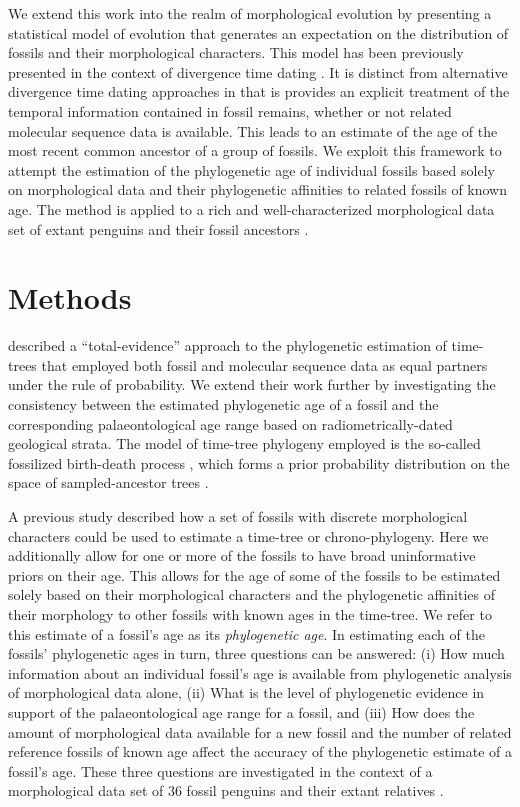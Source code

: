 \documentclass[11pt]{article}
\begin{document}
We extend this work into the realm of morphological evolution by presenting a statistical model of evolution that generates an expectation on the distribution of fossils and their morphological characters. This model has been previously presented in the context of divergence time dating \autocite{gavr2014,gavryushkina2015bayesian}. It is distinct from alternative divergence time dating approaches in that is provides an explicit treatment of the temporal information contained in fossil remains, whether or not related molecular sequence data is available. This leads to an estimate of the age of the most recent common ancestor of a group of fossils. We exploit this framework to attempt the estimation of the phylogenetic age of individual fossils based solely on morphological data and their phylogenetic affinities to related fossils of known age. The method is applied to a rich and well-characterized morphological data set of extant penguins and their fossil ancestors \autocite{ksepka2010,ksepka2012}.

\section*{Methods}

\textcite{gavryushkina2015bayesian} described a ``total-evidence'' approach to the phylogenetic estimation of time-trees that employed both fossil and molecular sequence data as equal partners under the rule of probability. We extend their work further by investigating the consistency between the estimated phylogenetic age of a fossil and the corresponding palaeontological age range based on radiometrically-dated geological strata. The model of time-tree phylogeny employed is the so-called fossilized birth-death process \autocite{Heath2014}, which forms a prior probability distribution on the space of sampled-ancestor trees \autocite{Gavr2013}.

A previous study described how a set of fossils with discrete morphological characters could be used to estimate a time-tree or chrono-phylogeny. Here we additionally allow for one or more of the fossils to have broad uninformative priors on their age. This allows for the age of some of the fossils to be estimated solely based on their morphological characters and the phylogenetic affinities of their morphology to other fossils with known ages in the time-tree. We refer to this estimate of a fossil's age as its {\em phylogenetic age}. In estimating each of the fossils' phylogenetic ages in turn, three questions can be answered: (i) How much information about an individual fossil's age is available from phylogenetic analysis of morphological data alone, (ii) What is the level of phylogenetic evidence in support of the palaeontological age range for a fossil, and (iii) How does the amount of morphological data available for a new fossil and the number of related reference fossils of known age affect the accuracy of the phylogenetic estimate of a fossil's age. These three questions are investigated in the context of a morphological data set of 36 fossil penguins and their extant relatives \autocite{ksepka2010,ksepka2012,gavryushkina2015bayesian}.
\end{document}
